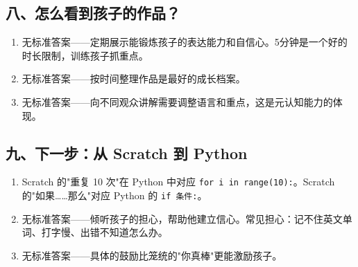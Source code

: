 \documentclass[a4paper,12pt]{ctexart}
\begin{document}
\subsection*{八、怎么看到孩子的作品？}
\begin{enumerate}
  \item 无标准答案——定期展示能锻炼孩子的表达能力和自信心。5分钟是一个好的时长限制，训练孩子抓重点。
  \item 无标准答案——按时间整理作品是最好的成长档案。
  \item 无标准答案——向不同观众讲解需要调整语言和重点，这是元认知能力的体现。
\end{enumerate}

\subsection*{九、下一步：从 Scratch 到 Python}
\begin{enumerate}
  \item Scratch 的"重复 10 次"在 Python 中对应 \texttt{for i in range(10):}。Scratch 的"如果……那么"对应 Python 的 \texttt{if 条件:}。
  \item 无标准答案——倾听孩子的担心，帮助他建立信心。常见担心：记不住英文单词、打字慢、出错不知道怎么办。
  \item 无标准答案——具体的鼓励比笼统的"你真棒"更能激励孩子。
\end{enumerate}
\end{document}
